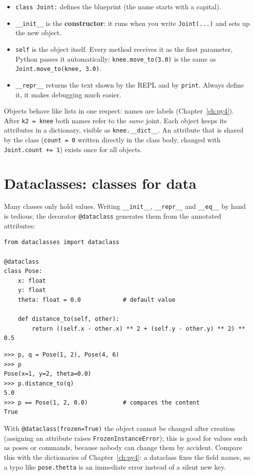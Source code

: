 \begin{itemize}[nosep]
  \item \texttt{class Joint:} defines the blueprint (the name starts with a capital).
  \item \texttt{\_\_init\_\_} is the \textbf{constructor}: it runs when you write \verb!Joint(...)! and sets up the new object.
  \item \texttt{self} is the object itself. Every method receives it as the first parameter, Python passes it automatically: \verb!knee.move_to(3.0)! is the same as \verb!Joint.move_to(knee, 3.0)!.
  \item \texttt{\_\_repr\_\_} returns the text shown by the REPL and by \texttt{print}. Always define it, it makes debugging much easier.
\end{itemize}
Objects behave like lists in one respect: names are labels (Chapter~\ref{ch:py4}). After \verb!k2 = knee! both names refer to the \emph{same} joint. Each object keeps its attributes in a dictionary, visible as \texttt{knee.\_\_dict\_\_}. An attribute that is shared by the class (\verb!count = 0! written directly in the class body, changed with \verb!Joint.count += 1!) exists once for all objects.

\section*{Dataclasses: classes for data}
Many classes only hold values. Writing \texttt{\_\_init\_\_}, \texttt{\_\_repr\_\_} and \texttt{\_\_eq\_\_} by hand is tedious; the decorator \texttt{@dataclass} generates them from the annotated attributes:
\begin{verbatim}
from dataclasses import dataclass

@dataclass
class Pose:
    x: float
    y: float
    theta: float = 0.0            # default value

    def distance_to(self, other):
        return ((self.x - other.x) ** 2 + (self.y - other.y) ** 2) ** 0.5
\end{verbatim}
\begin{verbatim}
>>> p, q = Pose(1, 2), Pose(4, 6)
>>> p
Pose(x=1, y=2, theta=0.0)
>>> p.distance_to(q)
5.0
>>> p == Pose(1, 2, 0.0)          # compares the content
True
\end{verbatim}
With \verb!@dataclass(frozen=True)! the object cannot be changed after creation (assigning an attribute raises \texttt{FrozenInstanceError}); this is good for values such as poses or commands, because nobody can change them by accident. Compare this with the dictionaries of Chapter~\ref{ch:py4}: a dataclass fixes the field names, so a typo like \texttt{pose.thetta} is an immediate error instead of a silent new key.

